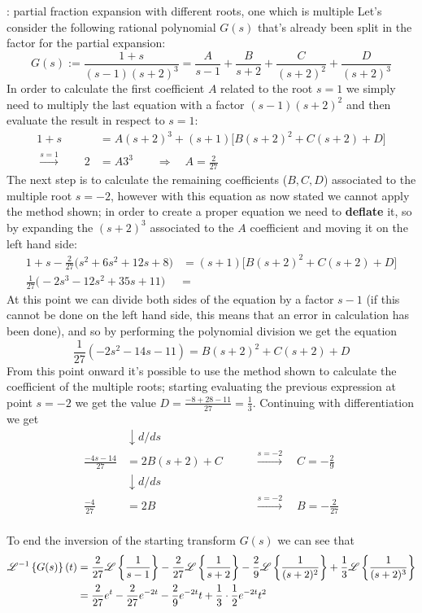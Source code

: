 	\begin{example}{: partial fraction expansion with different roots, one which is multiple}
		Let's consider the following rational polynomial $G(s)$ that's already been split in the factor for the partial expansion:
		\[G(s):= \frac{1+s}{(s-1)(s+2)^3} = \frac{A}{s-1} + \frac{B}{s+2} + \frac{C}{(s+2)^2} + \frac{D}{(s+2)^3} \]
		In order to calculate the first coefficient $A$ related to the root $s=1$ we simply need to multiply the last equation with a factor $(s-1)(s+2)^2$ and then evaluate the result in respect to $s=1$:
		\begin{align*}
			1+s & = A(s+2)^3 + (s+1) \Big[ B(s+2)^2 + C(s+2) + D \Big] \\
			\xrightarrow{s=1} \qquad 2 & =A 3^3 \qquad \Rightarrow \quad A = \frac 2 {27}
		\end{align*}
		The next step is to calculate the remaining coefficients ($B,C,D$) associated to the multiple root $s=-2$, however with this equation as now stated we cannot apply the method shown; in order to create a proper equation we need to \textbf{deflate} it, so by expanding the $(s+2)^3$ associated to the $A$ coefficient and moving it on the left hand side:
		\begin{align*}
			1+s - \frac 2 {27} \Big( s^2 + 6s^2 + 12s +8 \Big) & = (s+1) \Big[ B(s+2)^2 + C(s+2) + D \Big] \\
			\frac 1 {27} \Big( -2s^3 -12s^2+35s +11 \Big) & =
		\end{align*}
		At this point we can divide both sides of the equation by a factor $s-1$ (if this cannot be done on the left hand side, this means that an error in calculation has been done), and so by performing the polynomial division we get the equation
		\[ \frac 1{27} \left( -2s^2 -14s -11 \right) = B(s+2)^2 + C(s+2) + D \]
		From this point onward it's possible to use the method shown to calculate the coefficient of the multiple roots; starting evaluating the previous expression at point $s=-2$ we get the value $D = \frac{-8+28-11}{27} = \frac 1 3$. Continuing with differentiation we get
		\begin{align*}
			& \downarrow d/ds \\ 
			\frac{-4s -14}{27} & = 2B(s+2) + C  \qquad & \xrightarrow{s=-2} \quad C = -\frac 2 9 \\
			& \downarrow d/ds \\ 
			\frac{-4}{27} & = 2B  & \xrightarrow{s=-2} \quad B = -\frac 2 {27} \\
		\end{align*}
	
		To end the inversion of the starting transform $G(s)$ we can see that
		\begin{align*}
			\mathscr{L}^{-1} \left\{ G(s) \right\}(t) & = \frac 2 {27} \mathscr{L} \left\{ \frac 1 {s-1} \right\} - \frac 2 {27} \mathscr{L} \left\{ \frac 1 {s+2} \right\} - \frac 2 {9} \mathscr{L} \left\{ \frac 1 {(s+2)^2} \right\}  + \frac 1 3 \mathscr{L} \left\{ \frac 1 {(s+2)^3} \right\} \\
			& = \frac 2 {27} e^t - \frac 2 {27}e^{-2t} - \frac29 e^{-2t}t + \frac 1 3 \cdot \frac 1 2 e^{-2t} t^2
		\end{align*} 		
	\end{example}
	
